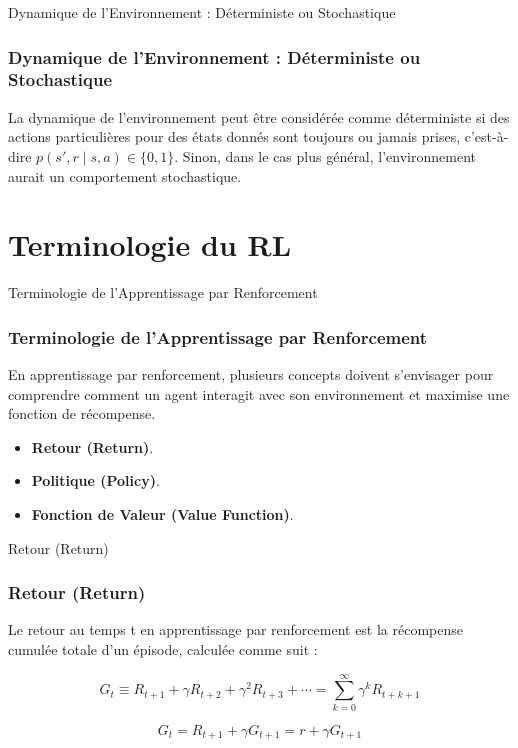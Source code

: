 \documentclass[serif, aspectratio=169]{beamer}
\begin{document}
\begin{frame}{Dynamique de l'Environnement : Déterministe ou Stochastique}
	\frametitle{Dynamique de l'Environnement : Déterministe ou Stochastique}
		
		La dynamique de l'environnement peut être considérée comme déterministe si des actions particulières pour des états donnés sont toujours ou jamais prises, c'est-à-dire \(p(s', r \mid s, a) \in \{0,1\}\). Sinon, dans le cas plus général, l'environnement aurait un comportement stochastique.
		
\end{frame}


\section{Terminologie du RL}

\begin{frame}{Terminologie de l'Apprentissage par Renforcement}
	\frametitle{Terminologie de l'Apprentissage par Renforcement}
	
	En apprentissage par renforcement, plusieurs concepts doivent s'envisager pour comprendre comment un agent interagit avec son environnement et maximise une fonction de récompense.
	
	\vspace{10pt}
	
	\begin{itemize}
		\item \textbf{Retour (Return)}.
		
		\item \textbf{Politique (Policy)}.
		
		\item \textbf{Fonction de Valeur (Value Function)}.
	\end{itemize}
	
\end{frame}


\begin{frame}{Retour (Return)}
	\frametitle{Retour (Return)}
	
	Le retour au temps t en apprentissage par renforcement est la récompense cumulée totale d'un épisode, calculée comme suit :
	
	\[
	G_t \equiv R_{t+1} + \gamma R_{t+2} + \gamma^2 R_{t+3} + \cdots = \sum_{k=0}^{\infty} \gamma^k R_{t+k+1}
	\]
	
	\vspace{10pt}
	
	\[
	G_t = R_{t+1} + \gamma G_{t+1} = r + \gamma G_{t+1}
	\]
	
\end{frame}
\end{document}
